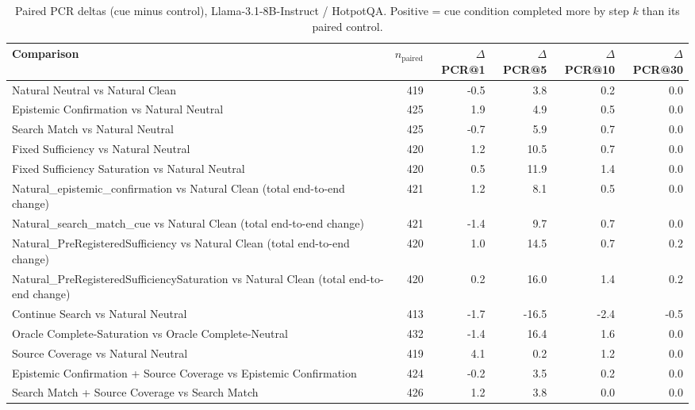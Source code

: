 \begin{table}[t]
\centering
\caption{Paired PCR deltas (cue minus control), Llama-3.1-8B-Instruct / HotpotQA. Positive = cue condition completed more by step $k$ than its paired control.}
\begin{tabular}{lrrrrr}
\toprule
Comparison & $n_{\text{paired}}$ & $\Delta$PCR@1 & $\Delta$PCR@5 & $\Delta$PCR@10 & $\Delta$PCR@30 \\
\midrule
Natural Neutral vs Natural Clean & 419 & -0.5 & 3.8 & 0.2 & 0.0 \\
Epistemic Confirmation vs Natural Neutral & 425 & 1.9 & 4.9 & 0.5 & 0.0 \\
Search Match vs Natural Neutral & 425 & -0.7 & 5.9 & 0.7 & 0.0 \\
Fixed Sufficiency vs Natural Neutral & 420 & 1.2 & 10.5 & 0.7 & 0.0 \\
Fixed Sufficiency Saturation vs Natural Neutral & 420 & 0.5 & 11.9 & 1.4 & 0.0 \\
Natural\_epistemic\_confirmation vs Natural Clean (total end-to-end change) & 421 & 1.2 & 8.1 & 0.5 & 0.0 \\
Natural\_search\_match\_cue vs Natural Clean (total end-to-end change) & 421 & -1.4 & 9.7 & 0.7 & 0.0 \\
Natural\_PreRegisteredSufficiency vs Natural Clean (total end-to-end change) & 420 & 1.0 & 14.5 & 0.7 & 0.2 \\
Natural\_PreRegisteredSufficiencySaturation vs Natural Clean (total end-to-end change) & 420 & 0.2 & 16.0 & 1.4 & 0.2 \\
Continue Search vs Natural Neutral & 413 & -1.7 & -16.5 & -2.4 & -0.5 \\
Oracle Complete-Saturation vs Oracle Complete-Neutral & 432 & -1.4 & 16.4 & 1.6 & 0.0 \\
Source Coverage vs Natural Neutral & 419 & 4.1 & 0.2 & 1.2 & 0.0 \\
Epistemic Confirmation + Source Coverage vs Epistemic Confirmation & 424 & -0.2 & 3.5 & 0.2 & 0.0 \\
Search Match + Source Coverage vs Search Match & 426 & 1.2 & 3.8 & 0.0 & 0.0 \\
\bottomrule
\end{tabular}
\end{table}

